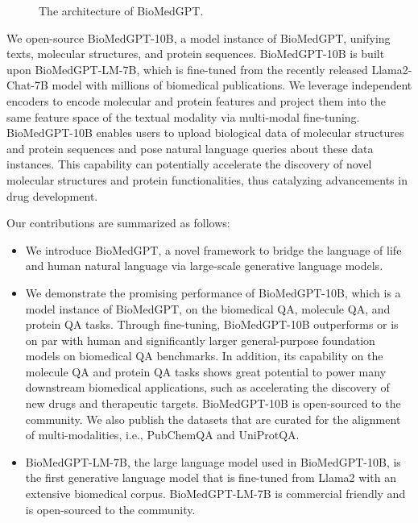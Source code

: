 \documentclass{article}
\begin{document}
\begin{figure}[htp]
  \centering
{}
  \caption{The architecture of BioMedGPT.}
  \label{biomedgpt-u}
\end{figure}

We open-source BioMedGPT-10B, a model instance of BioMedGPT, unifying texts, molecular structures, and protein sequences. BioMedGPT-10B is built upon BioMedGPT-LM-7B, which is fine-tuned from the recently released Llama2-Chat-7B model with millions of biomedical publications. We leverage independent encoders to encode molecular and protein features and project them into the same feature space of the textual modality via multi-modal fine-tuning. BioMedGPT-10B enables users to upload biological data of molecular structures and protein sequences and pose natural language queries about these data instances. This capability can potentially accelerate the discovery of novel molecular structures and protein functionalities, thus catalyzing advancements in drug development.


Our contributions are summarized as follows:

\begin{itemize}
    \item We introduce BioMedGPT, a novel framework to bridge the language of life and human natural language via large-scale generative language models. 
    
    \item We demonstrate the promising performance of BioMedGPT-10B, which is a model instance of BioMedGPT, on the biomedical QA, molecule QA, and protein QA tasks. Through fine-tuning, BioMedGPT-10B outperforms or is on par with human and significantly larger general-purpose foundation models on biomedical QA benchmarks. In addition, 
    its capability on the molecule QA and protein QA tasks shows great potential to power many downstream biomedical applications, such as accelerating the discovery of new drugs and therapeutic targets. BioMedGPT-10B is open-sourced to the community. We also publish the datasets that are curated for the alignment of multi-modalities, i.e., PubChemQA and UniProtQA. 

    \item BioMedGPT-LM-7B, the large language model used in BioMedGPT-10B, is the first generative language model that is fine-tuned from Llama2 with an extensive biomedical corpus. BioMedGPT-LM-7B is commercial friendly and is open-sourced to the community. 


\end{itemize}
\end{document}
